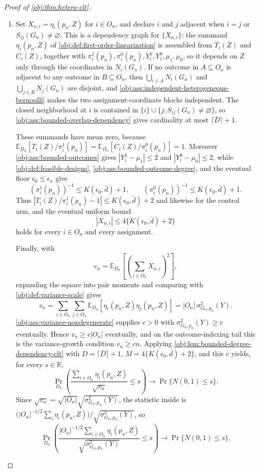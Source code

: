 \documentclass[11pt]{article}
\begin{document}
\begin{proof}[Proof of \cref{obj:thm:hetero-clt}]
\begin{enumerate}
\item Set \(X_{n,i}=\eta_i(p_n,Z)\) for \(i\in O_n\), and declare \(i\) and \(j\) adjacent when \(i=j\) or \(S_{ij}(G_n)\neq\varnothing\).  This is a dependency graph for \(\{X_{n,i}\}\): the summand \(\eta_i(p_n,Z)\) of \cref{obj:def:first-order-linearization} is assembled from \(T_i(Z)\) and \(C_i(Z)\), together with \(\pi_i^1(p_n),\pi_i^0(p_n),Y_i^1,Y_i^0,\mu_1,\mu_0\), so it depends on \(Z\) only through the coordinates in \(N_i(G_n)\).  If no outcome in \(A\subseteq O_n\) is adjacent to any outcome in \(B\subseteq O_n\), then \(\bigcup_{i\in A}N_i(G_n)\) and \(\bigcup_{j\in B}N_j(G_n)\) are disjoint, and \cref{obj:ass:independent-heterogeneous-bernoulli} makes the two assignment-coordinate blocks independent.  The closed neighborhood at \(i\) is contained in \(\{i\}\cup\{j:S_{ij}(G_n)\neq\varnothing\}\), so \cref{obj:ass:bounded-overlap-dependency} gives cardinality at most \(\lceil\bar D\rceil+1\).

These summands have mean zero, because \(\mathbb E_{D_n}[T_i(Z)/\pi_i^1(p_n)]=\mathbb E_{D_n}[C_i(Z)/\pi_i^0(p_n)]=1\).
Moreover \cref{obj:ass:bounded-outcomes} gives \(|Y_i^1-\mu_1|\le2\) and \(|Y_i^0-\mu_0|\le2\), while \cref{obj:def:feasible-designs}, \cref{obj:ass:bounded-outcome-degree}, and the eventual floor \(\epsilon_0\le\epsilon_n\) give
\[
\left(\pi_i^1(p_n)\right)^{-1}\le K(\epsilon_0,\bar d)+1,
\qquad
\left(\pi_i^0(p_n)\right)^{-1}\le K(\epsilon_0,\bar d)+1 .
\]
Thus \(|T_i(Z)/\pi_i^1(p_n)-1|\le K(\epsilon_0,\bar d)+2\) and likewise for the control arm, and the eventual uniform bound
\[
|X_{n,i}|\le 4\{K(\epsilon_0,\bar d)+2\}
\]
holds for every \(i\in O_n\) and every assignment.

Finally, with
\[
v_n=\mathbb E_{D_n}\!\left[\left(\sum_{i\in O_n}X_{n,i}\right)^2\right],
\]
expanding the square into pair moments and comparing with \cref{obj:def:variance-scale} gives
\[
v_n=
\sum_{i\in O_n}\sum_{j\in O_n}
\mathbb E_{D_n}\!\left[\eta_i(p_n,Z)\eta_j(p_n,Z)\right]
=|O_n|\,\sigma^2_{G_n,p_n}(Y).
\]
\cref{obj:ass:variance-nondegenerate} supplies \(c>0\) with \(\sigma^2_{G_n,p_n}(Y)\ge c\) eventually.  Hence \(v_n\ge c|O_n|\) eventually, and on the outcome-indexing tail this is the variance-growth condition \(v_n\ge cn\).  Applying \cref{obj:lem:bounded-degree-dependency-clt} with \(D=\lceil\bar D\rceil+1\), \(M=4\{K(\epsilon_0,\bar d)+2\}\), and this \(c\) yields, for every \(s\in\mathbb R\),
\[
\Pr_{D_n}\!\left(\frac{\sum_{i\in O_n}\eta_i(p_n,Z)}{\sqrt{v_n}}\le s\right)
\longrightarrow
\Pr\{N(0,1)\le s\}.
\]
Since \(\sqrt{v_n}=\sqrt{|O_n|}\sqrt{\sigma^2_{G_n,p_n}(Y)}\), the statistic inside is
\(\bigl(|O_n|^{-1/2}\sum_i\eta_i(p_n,Z)\bigr)\big/\sqrt{\sigma^2_{G_n,p_n}(Y)}\), so
\[
\Pr_{D_n}\!\left(
\frac{|O_n|^{-1/2}\sum_{i\in O_n}\eta_i(p_n,Z)}
{\sqrt{\sigma^2_{G_n,p_n}(Y)}}\le s
\right)
\longrightarrow
\Pr\{N(0,1)\le s\}.
\]


\end{enumerate}
\end{proof}
\end{document}
